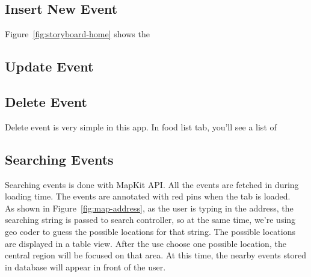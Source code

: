 \subsection{Insert New Event} %
\label{sub:insert_new_event}
	Figure~\ref{fig:storyboard-home} shows the 

\subsection{Update Event} %
\label{sub:update_event}



\subsection{Delete Event} %
\label{sub:delete_event}

	Delete event is very simple in this app. In food list tab, you'll see a list of 

\subsection{Searching Events} %
\label{sub:searching_logic}
	
	Searching events is done with MapKit API. All the events are fetched in during loading time. The events are annotated with red pins when the tab is loaded.   \\
	As shown in Figure~\ref{fig:map-address}, as the user is typing in the address, the searching string is passed to search controller, so at the same time, we're using geo coder to guess the possible locations for that string. The possible locations are displayed in a table view. After the use choose one possible location, the central region will be focused on that area. At this time, the nearby events stored in database will appear in front of the user.
	


